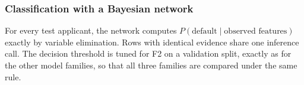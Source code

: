 \subsubsection{Classification with a Bayesian network}
For every test applicant, the network computes $P(\text{default} \mid \text{observed features})$ exactly by variable elimination.
Rows with identical evidence share one inference call.
The decision threshold is tuned for F2 on a validation split, exactly as for the other model families, so that all three families are compared under the same rule.
